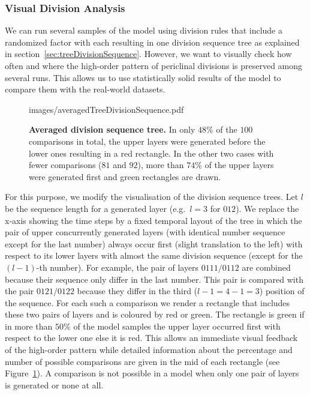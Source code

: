 \documentclass[11pt,a4paper, draft]{article}
\begin{document}
\subsubsection{Visual Division Analysis}
\noindent
We can run several samples of the model using division rules that include a randomized factor with each resulting in one division sequence tree as explained in section~\ref{sec:treeDivisionSequence}. However, we want to visually check how often and where the high-order pattern of periclinal divisions is preserved among several runs. This allows us to use statistically solid results of the model to compare them with the real-world datasets.
%
\begin{figure}[htbp]
	\begin{center}
		\begin{overpic}[width=0.5\linewidth]{images/averagedTreeDivisionSequence.pdf}
		\end{overpic}
\caption[Averaged division sequence tree.]
{
{\bf Averaged division sequence tree.} In only $48 \%$ of the $100$ comparisons in total, the upper layers were generated before the lower ones resulting in a red rectangle. In the other two cases with fewer comparisons ($81$ and $92$), more than $74 \%$ of the upper layers were generated first and green rectangles are drawn.
}
	\label{fig:averagedTreeDivisionSequence}
	\end{center}
\end{figure}
%
For this purpose, we modify the visualisation of the division sequence trees. Let $l$ be the sequence length for a generated layer (e.g.\ $l=3$ for $012$). We replace the x-axis showing the time steps by a fixed temporal layout of the tree in which the pair of upper concurrently generated layers (with identical number sequence except for the last number) always occur first (slight translation to the left) with respect to its lower layers with almost the same division sequence (except for the $(l-1)$-th number). For example, the pair of layers $0111/0112$ are combined because their sequence only differ in the last number. This pair is compared with the pair $0121/0122$ because they differ in the third ($l-1 = 4-1 = 3$) position of the sequence. For each such a comparison we render a rectangle that includes these two pairs of layers and is coloured by red or green. The rectangle is green if in more than $50 \%$ of the model samples the upper layer occurred first with respect to the lower one else it is red. This allows an immediate visual feedback of the high-order pattern while detailed information about the percentage and number of possible comparisons are given in the mid of each rectangle (see Figure~\ref{fig:averagedTreeDivisionSequence}). A comparison is not possible in a model when only one pair of layers is generated or none at all.
\end{document}
